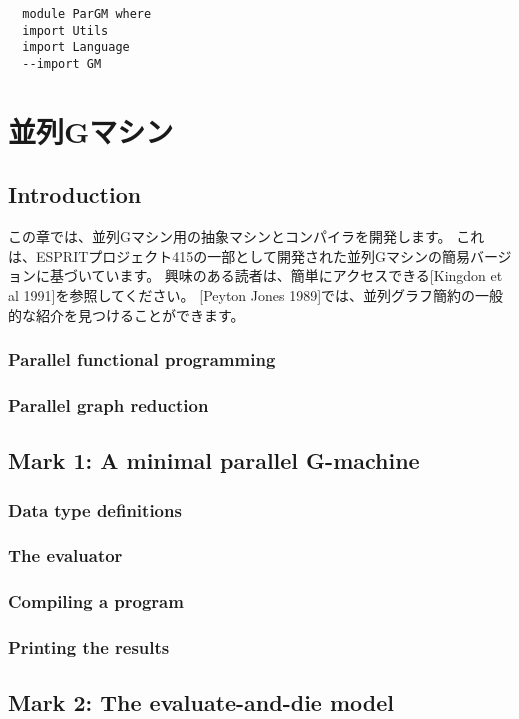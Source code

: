 \documentclass{jarticle}
\begin{document}
\newpage

\begin{verbatim}
  module ParGM where
  import Utils
  import Language
  --import GM
\end{verbatim}
\newpage

\section{並列Gマシン}

\subsection{Introduction}

この章では、並列Gマシン用の抽象マシンとコンパイラを開発します。
これは、ESPRITプロジェクト415の一部として開発された並列Gマシンの簡易バージョンに基づいています。
興味のある読者は、簡単にアクセスできる[Kingdon et al 1991]を参照してください。
[Peyton Jones 1989]では、並列グラフ簡約の一般的な紹介を見つけることができます。

\subsubsection{Parallel functional programming}
\subsubsection{Parallel graph reduction}
\newpage

\subsection{Mark 1: A minimal parallel G-machine}
\subsubsection{Data type definitions}
\subsubsection{The evaluator}
\subsubsection{Compiling a program}
\subsubsection{Printing the results}
\newpage

\subsection{Mark 2: The evaluate-and-die model}
\end{document}
